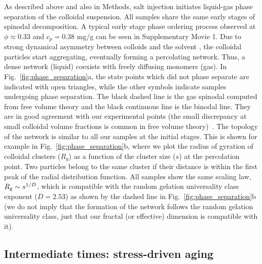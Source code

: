 \documentclass[preprint,amsmath,amssymb,superscriptaddress]{revtex4-1}
\begin{document}
As described above and also in Methods, salt injection initiates liquid-gas phase separation of the colloidal suspension. 
All samples share the same early stages of spinodal decomposition. 
A typical early stage phase ordering process observed at $\phi\approx 0.33$ and $c_p=0.38$ mg/g can be seen in Supplementary Movie 1.
Due to strong dynamical asymmetry between colloids and the solvent \cite{tanaka1999colloid}, the colloidal particles start aggregating, 
eventually forming a percolating network. Thus, a dense network (liquid) coexists with freely diffusing monomers (gas).
In Fig.~\ref{fig:phase_separation}a, the state points which did not phase separate are indicated with open triangles, while
the other symbols indicate samples undergoing phase separation. The black dashed line is the gas spinodal computed from free volume theory and the 
black continuous line is the binodal line. They are in good agreement with our experimental points (the small discrepancy at small colloidal volume fractions 
is common in free volume theory)~\cite{Royall2007,lu2008gelation}.
The topology of the network is similar to all our samples at the initial stages. 
This is shown for example in Fig.~\ref{fig:phase_separation}b, where we plot the radius of gyration of colloidal clusters ($R_g$)
as a function of the cluster size ($s$) at the percolation point. Two particles belong to the same cluster if their distance is
within the first peak of the radial distribution function. All samples show the same scaling law, $R_{\rm g}\sim s^{1/D}$, which is compatible with
the random gelation universality class exponent ($D=2.53$) as shown by the dashed line in Fig.~\ref{fig:phase_separation}b
(we do not imply that the formation of the network follows the random gelation universality class, just that our
fractal (or effective) dimension is compatible with it).

\subsection{Intermediate times: stress-driven aging}
\end{document}
